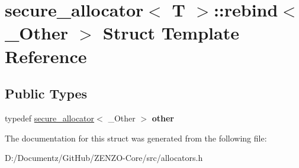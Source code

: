 \hypertarget{structsecure__allocator_1_1rebind}{}\section{secure\+\_\+allocator$<$ T $>$\+::rebind$<$ \+\_\+\+Other $>$ Struct Template Reference}
\label{structsecure__allocator_1_1rebind}
\subsection*{Public Types}
\begin{DoxyCompactItemize}
\item 
\mbox{\label{structsecure__allocator_1_1rebind_aa0688d32e40d8ae116efec5946f1a3b5}} 
typedef \mbox{\hyperlink{structsecure__allocator}{secure\+\_\+allocator}}$<$ \+\_\+\+Other $>$ {\bfseries other}
\end{DoxyCompactItemize}


The documentation for this struct was generated from the following file\+:\begin{DoxyCompactItemize}
\item 
D\+:/\+Documentz/\+Git\+Hub/\+Z\+E\+N\+Z\+O-\/\+Core/src/allocators.\+h\end{DoxyCompactItemize}
